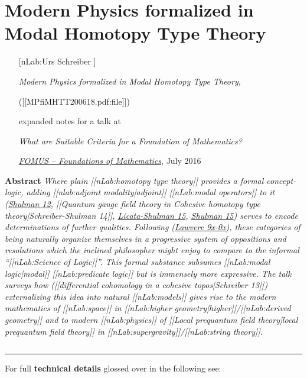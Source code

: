 \documentclass[12pt,titlepage]{article}
\theoremstyle{plain}
\theoremstyle{definition}
\theoremstyle{remark}
\begin{document}


\section*{Modern Physics formalized in Modal Homotopy Type Theory}

\begin{itemize}%
\item [[nLab:Urs Schreiber]]

\emph{Modern Physics formalized in Modal Homotopy Type Theory},

 ([[MPfiMHTT200618.pdf:file]])

expanded notes for a talk at

\emph{What are Suitable Criteria for a Foundation of Mathematics?}

\emph{\href{http://fomus.weebly.com/}{FOMUS -- Foundations of Mathematics}}, July 2016



\end{itemize}
\textbf{Abstract} \emph{Where plain [[nLab:homotopy type theory]] provides a formal concept-logic, adding [[nlab:adjoint modality|adjoint]] [[nLab:modal operators]] to it (\href{modal+type+theory}{Shulman 12}, [[Quantum gauge field theory in Cohesive homotopy type theory|Schreiber-Shulman 14]], \hyperlink{LicataShulman}{Licata-Shulman 15}, \hyperlink{Shulman15}{Shulman 15}) serves to encode determinations of further qualities. Following (\href{cohesive+topos#References}{Lawvere 9x-0x}), these categories of being naturally organize themselves in a progressive system of oppositions and resolutions which the inclined philosopher might enjoy to compare to the informal ``[[nLab:Science of Logic]]''. This formal substance subsumes [[nLab:modal logic|modal]] [[nLab:predicate logic]] but is immensely more expressive. The talk surveys how ([[differential cohomology in a cohesive topos|Schreiber 13]]) externalizing this idea into natural [[nLab:models]] gives rise to the modern mathematics of [[nLab:space]] in [[nLab:higher geometry|higher]]/[[nLab:derived geometry]] and to modern [[nLab:physics]] of [[Local prequantum field theory|local prequantum field theory]] in [[nLab:supergravity]]/[[nLab:string theory]].}

$\,$


\vspace{.5em} \hrule \vspace{.5em}
For full \textbf{technical details} glossed over in the following see:
\end{document}
